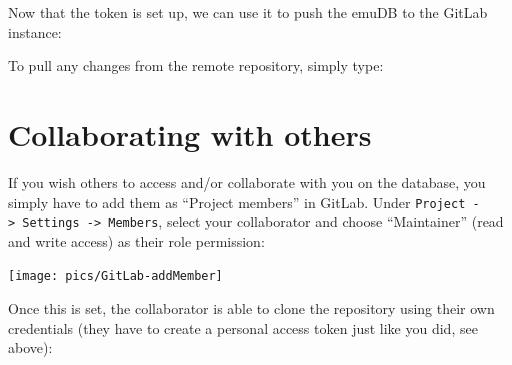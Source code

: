 \documentclass[]{book}
\newenvironment{Shaded}{\begin{snugshade}}{\end{snugshade}}
\newcommand{\DataTypeTok}[1]{\textcolor[rgb]{0.13,0.29,0.53}{#1}}
\newcommand{\KeywordTok}[1]{\textcolor[rgb]{0.13,0.29,0.53}{\textbf{#1}}}
\newcommand{\NormalTok}[1]{#1}
\newcommand{\OperatorTok}[1]{\textcolor[rgb]{0.81,0.36,0.00}{\textbf{#1}}}
\newcommand{\OtherTok}[1]{\textcolor[rgb]{0.56,0.35,0.01}{#1}}
\newcommand{\StringTok}[1]{\textcolor[rgb]{0.31,0.60,0.02}{#1}}
\begin{document}
Now that the token is set up, we can use it to push the emuDB to the GitLab instance:

\begin{Shaded}
\end{Shaded}

To pull any changes from the remote repository, simply type:

\begin{Shaded}
\end{Shaded}

\hypertarget{collaborating-with-others}{%
\section{Collaborating with others}\label{collaborating-with-others}}

If you wish others to access and/or collaborate with you on the database, you simply have to add them as ``Project members'' in GitLab. Under \texttt{Project\ -\textgreater{}\ Settings\ -\textgreater{}\ Members}, select your collaborator and choose ``Maintainer'' (read and write access) as their role permission:

\begin{center}\texttt{[image: pics/GitLab-addMember]} \end{center}

Once this is set, the collaborator is able to clone the repository using their own credentials (they have to create a personal access token just like you did, see above):
\end{document}

